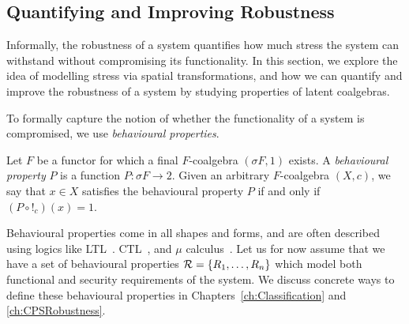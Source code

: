 




\subsection{Quantifying and Improving Robustness}
\label{sec:Latent:Robustness}
Informally, the robustness of a system quantifies how much stress the system can withstand without compromising its functionality. 
In this section, we explore the idea of modelling stress via spatial transformations, and how we can quantify and improve the robustness of a system by studying properties of latent coalgebras.

To formally capture the notion of whether the functionality of a system is compromised, we use \emph{behavioural properties}.
\begin{definition}
    \label{def:Latent:BehaviouralProperty}
    Let $F$ be a functor for which a final $F$-coalgebra $(\sigma F, 1)$ exists. A \emph{behavioural property} $P$ is a function $P\colon \sigma F\rightarrow 2$. Given an arbitrary $F$-coalgebra $(X,c)$, we say that $x\in X$ satisfies the behavioural property $P$ if and only if $(P\circ !_c)(x)=1$.
\end{definition}
Behavioural properties come in all shapes and forms, and are often described using logics like LTL~\cite{LTL}. CTL~\cite{CTL}, and $\mu$ calculus~\cite{MuCalculus}. Let us for now assume that we have a set of behavioural properties $\mathcal{R}=\left\{R_1, \ldots, R_n\right\}$ which model both functional and security requirements of the system. We discuss concrete ways to define these behavioural properties in Chapters~\ref{ch:Classification} and \ref{ch:CPSRobustness}.

